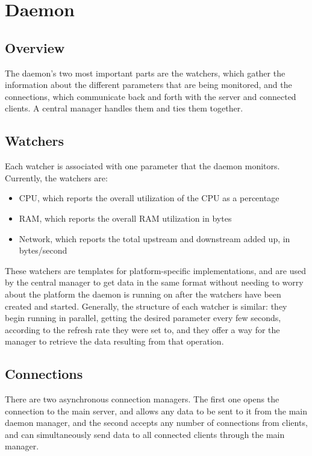 \documentclass{l3proj}
\begin{document}

\section{Daemon}

\subsection{Overview}

The daemon's two most important parts are the watchers, which gather the information about the different parameters that are being monitored, and the connections, which communicate back and forth with the server and connected clients. A central manager handles them and ties them together.

\subsection{Watchers}

Each watcher is associated with one parameter that the daemon monitors. Currently, the watchers are:
\begin{itemize}
  \item CPU, which reports the overall utilization of the CPU as a percentage
  \item RAM, which reports the overall RAM utilization in bytes
  \item Network, which reports the total upstream and downstream added up, in bytes/second
\end{itemize}
These watchers are templates for platform-specific implementations, and are used by the central manager to get data in the same format without needing to worry about the platform the daemon is running on after the watchers have been created and started.
Generally, the structure of each watcher is similar: they begin running in parallel, getting the desired parameter every few seconds, according to the refresh rate they were set to, and they offer a way for the manager to retrieve the data resulting from that operation.

\subsection{Connections}
There are two asynchronous connection managers. The first one opens the connection to the main server, and allows any data to be sent to it from the main daemon manager, and the second accepts any number of connections from clients, and can simultaneously send data to all connected clients through the main manager.
\end{document}
